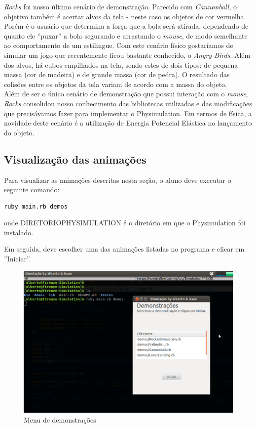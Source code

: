 \textit{Rocks} foi nosso último cenário de demonstração. Parecido com \textit{Cannonball}, o objetivo também é acertar alvos da tela - neste caso os objetos de cor vermelha. Porém é o usuário que determina a força que a bola será atirada, dependendo de quanto ele ''puxar'' a bola segurando e arrastando o \textit{mouse}, de modo semelhante ao comportamento de um estilingue. Com este cenário físico gostaríamos de simular um jogo que recentemente ficou bastante conhecido, o \textit{Angry Birds}. Além dos alvos, há cubos empilhados na tela, sendo estes de dois tipos: de pequena massa (cor de madeira) e de grande massa (cor de pedra). O resultado das colisões entre os objetos da tela variam de acordo com a massa do objeto. \\

Além de ser o único cenário de demonstração que possui interação com o \textit{mouse}, \textit{Rocks} consolidou nosso conhecimento das bibliotecas utilizadas e das modificações que precisávamos fazer para implementar o Physimulation. Em termos de física, a novidade deste cenário é a utilização de Energia Potencial Elástica no lançamento do objeto. 

\subsection{Visualização das animações}
Para visualizar as animações descritas nesta seção, o aluno deve executar o seguinte comando:

\begin{verbatim}
ruby main.rb demos
\end{verbatim}

onde DIRETORIOPHYSIMULATION é o diretório em que o Physimulation foi instalado.

Em seguida, deve escolher uma das animações listadas no programa e clicar em ''Iniciar''.

\begin{figure}[H]
	\centering
	\includegraphics[scale=0.4]{images/demos-menu.png}
	\caption{Menu de demonstrações}
	\hspace{0.5cm}
\end{figure}


